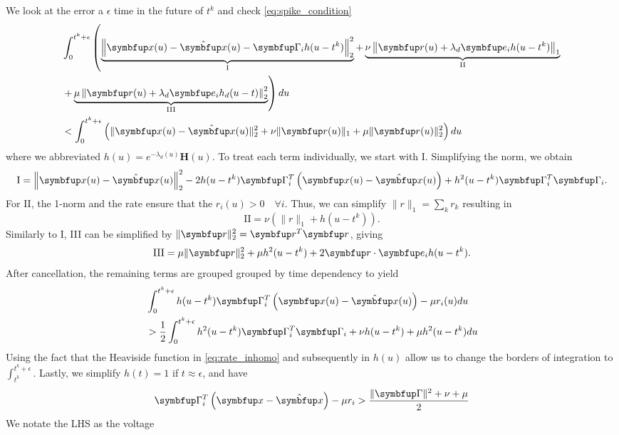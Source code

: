 We look at the error a $\epsilon$ time in the future of $t^k$ and check \cref{eq:spike_condition}
\begin{equation}
\begin{aligned}
& \int_0^{t^k+\epsilon} \left(\underbrace{\left\|\bmu{x}(u)-\hat{\bmu{x}}(u)-\bmu{\Gamma}_i h(u-t^k)\right\|_2^2}_{\text{I}}+
\underbrace{\nu\left\|\bmu{r}(u)+\lambda_d \bmu{e}_i h(u-t^k)\right\|_1}_{\text{II}}\right.\\
& \left.+\underbrace{\mu\left\|\bmu{r}(u)+\lambda_d \bmu{e}_i h_d(u-t)\right\|_2^2}_{\text{III}}\right) d u\\
& <\int_0^{t^k+\epsilon} \left(\|\bmu{x}(u)-\hat{\bmu{x}}(u)\|_2^2+\nu\|\bmu{r}(u)\|_1+\mu\|\bmu{r}(u)\|_2^2\right)d u
\end{aligned}
\end{equation}
where we abbreviated $h(u) = e^{-\lambda_d (u)} \bm{H}(u)$.
To treat each term individually, we start with I. Simplifying the norm, we obtain
\begin{equation}
	\text{I} = \left\|\bmu{x}(u)-\hat{\bmu{x}}(u)\right\|_2^2 -2h(u-t^k)\bmu{\Gamma}_i^T\left(\bmu{x}(u)-\hat{\bmu{x}}(u)\right) + h^2(u-t^k)\bmu{\Gamma}_i^T\bmu{\Gamma}_i.
\end{equation}
For II, the 1-norm and the rate ensure that the $r_i(u)>0 \quad
\forall i$. Thus, we can simplify $\|r\|_1 = \sum_k r_k$ resulting in
\begin{equation}
	\text{II} = \nu\left(\|r\|_1 + h(u-t^k)\right).
\end{equation}
Similarly to I, III can be simplified by $\|\bmu{r}\|^2_2 = \bmu{r}^T\bmu{r}$, giving
\begin{equation}
	\text{III} = \mu\|\bmu{r}\|^2_2 + \mu h^2(u-t^k) + 2\bmu{r}\cdot\bmu{e}_ih(u-t^k).
\end{equation}
After cancellation, the remaining terms are grouped grouped by time dependency to yield
\begin{equation}
\begin{aligned}
	&\int_0^{t^k+\epsilon}h(u-t^k)\bmu{\Gamma}_i^T\left(\bmu{x}(u)-\hat{\bmu{x}}(u)\right) - \mu r_i(u) d u \\
	&> \frac{1}{2} \int_0^{t^k+\epsilon} 	h^2(u-t^k)\bmu{\Gamma}_i^T\bmu{\Gamma}_i + 	\nu h(u-t^k) + \mu h^2(u-t^k) d u
\end{aligned}
\end{equation}
Using the fact that the Heaviside function in \cref{eq:rate_inhomo} and subsequently in $h(u)$ allow us to change the borders of integration to $\int_{t^k}^{t^k+\epsilon}$. Lastly, we simplify $h(t) = 1$ if $t\approx \epsilon$, and have
\begin{equation}
	\bmu{\Gamma}_i^T\left(\bmu{x}-\hat{\bmu{x}}\right) - \mu r_i>\frac{\|\bmu{\Gamma}\|^2 + \nu + \mu}{2}
\end{equation}
We notate the \ac{LHS} as the voltage


